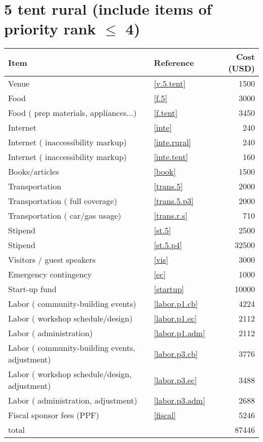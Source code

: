 \section*{5 tent rural (include items of priority rank $\leq$ 4)}
\begin{center}
\begin{tabular}{llr}
Item & Reference & Cost (USD) \\ \hline
Venue & \ref{v.5.tent} & 1500 \\
Food & \ref{f.5} & 3000 \\
Food ( prep materials, appliances...) & \ref{f.tent} & 3450 \\
Internet & \ref{inte} & 240 \\
Internet ( inaccessibility markup) & \ref{inte.rural} & 240 \\
Internet ( inaccessibility markup) & \ref{inte.tent} & 160 \\
Books/articles & \ref{book} & 1500 \\
Transportation & \ref{trans.5} & 2000 \\
Transportation ( full coverage) & \ref{trans.5.p3} & 2000 \\
Transportation ( car/gas usage) & \ref{trans.r.s} & 710 \\
Stipend & \ref{st.5} & 2500 \\
Stipend & \ref{st.5.p4} & 32500 \\
Visitors / guest speakers & \ref{vis} & 3000 \\
Emergency contingency & \ref{ec} & 1000 \\
Start-up fund & \ref{startup} & 10000 \\
Labor ( community-building events) & \ref{labor.p1.cb} & 4224 \\
Labor ( workshop schedule/design) & \ref{labor.p1.ec} & 2112 \\
Labor ( administration) & \ref{labor.p1.adm} & 2112 \\
Labor ( community-building events, adjustment) & \ref{labor.p3.cb} & 3776 \\
Labor ( workshop schedule/design, adjustment) & \ref{labor.p3.ec} & 3488 \\
Labor ( administration, adjustment) & \ref{labor.p3.adm} & 2688 \\
Fiscal sponsor fees (PPF) & \ref{fiscal} & 5246 \\ \hline
total &  & 87446
\end{tabular}
\end{center}
\newpage
